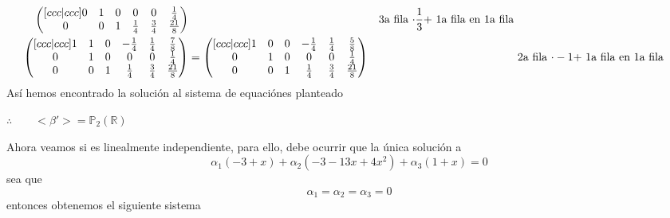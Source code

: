 \documentclass[letterpaper]{article}
\newcommand{\Po}{\mathds{P}_2(\mathds{R})}
\renewcommand{\*}{\cdot}
\theoremstyle{definition}
\begin{document}
\begin{align*}
\begin{pmatrix}[ccc|ccc]
	0 & 1 & 0 & 0 & 0 & \frac{1}{4}\\
	0 & 0 & 1 & \frac{1}{4} & \frac{3}{4} & \frac{21}{8}
	\end{pmatrix}  && \text{3a fila $ \* \frac{1}{3} + $ 1a fila en 1a fila } \\
	\begin{pmatrix}[ccc|ccc]
	1 & 1 & 0 & -\frac{1}{4} & \frac{1}{4} & \frac{7}{8} \\
	0 & 1 & 0 & 0 & 0 & \frac{1}{4}\\
	0 & 0 & 1 & \frac{1}{4} & \frac{3}{4} & \frac{21}{8}
	\end{pmatrix} &= \begin{pmatrix}[ccc|ccc]
	1 & 0 & 0 & -\frac{1}{4} & \frac{1}{4} & \frac{5}{8} \\
	0 & 1 & 0 & 0 & 0 & \frac{1}{4}\\
	0 & 0 & 1 & \frac{1}{4} & \frac{3}{4} & \frac{21}{8}
	\end{pmatrix} && \text{2a fila $ \* -1 + $ 1a fila en 1a fila}
\end{align*}
Así hemos encontrado la solución al sistema de equaciónes planteado
\begin{center}
	$ \therefore \qquad <\beta'> = \Po$
\end{center}
Ahora veamos si es linealmente independiente, para ello, debe ocurrir que la única solución a \[ \alpha_1(-3 + x) + \alpha_2(-3 -13x + 4x^2) + \alpha_3(1 + x) = 0 \]
sea que $$ \alpha_1 = \alpha_2 =  \alpha_3 = 0 $$
entonces obtenemos el siguiente sistema
\end{document}
